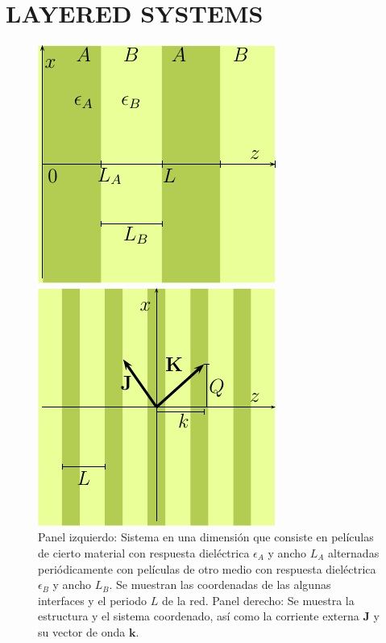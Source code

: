 \documentclass{iopart}
\begin{document}
\section{LAYERED SYSTEMS}
\begin{figure}
  \begin{minipage}{0.5\textwidth}
  \centering
  \includegraphics[scale=1]{1Dfronteras-pics}
  \end{minipage}
  \begin{minipage}{0.5\textwidth}
    \centering
    \includegraphics[scale=1]{red1d-pics}
  \end{minipage}
  \caption{Panel izquierdo: Sistema en una dimensión que consiste en
    películas de cierto material con respuesta dieléctrica
    $\epsilon_A$ y ancho $L_A$ alternadas periódicamente con películas
    de otro medio con respuesta dieléctrica $\epsilon_{B}$ y ancho
    $L_B$. Se muestran las coordenadas de las algunas interfaces y el
    periodo $L$ de la red. Panel derecho: Se muestra la estructura y
    el sistema coordenado, así como la corriente externa $\mathbf J$ y
    su vector de onda $\mathbf k$.}
  \label{1Dsys}
\end{figure}
\end{document}
